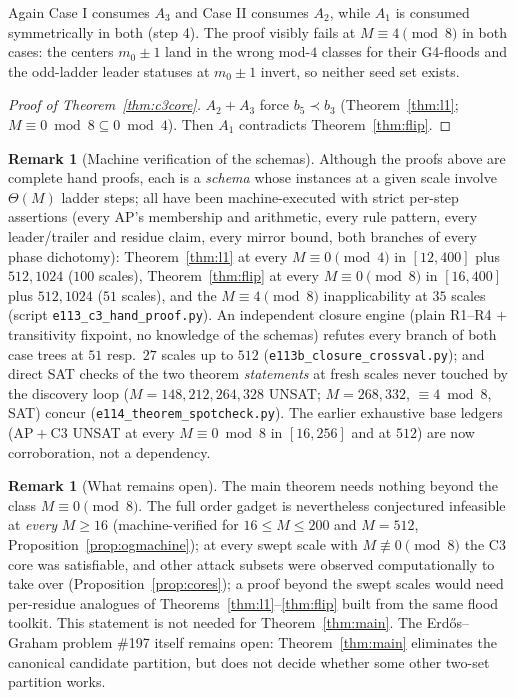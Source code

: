 \documentclass[11pt]{article}
\theoremstyle{definition}
\newtheorem{remark}[theorem]{Remark}
\begin{document}
Again Case I consumes $A_3$ and Case II consumes $A_2$, while $A_1$ is
consumed symmetrically in both (step 4). The proof visibly fails at
$M \equiv 4 \pmod 8$ in both cases: the centers $m_0 \pm 1$ land in
the wrong mod-$4$ classes for their G4-floods and the odd-ladder
leader statuses at $m_0 \pm 1$ invert, so neither seed set exists.

\begin{proof}[Proof of Theorem~\ref{thm:c3core}]
$A_2 + A_3$ force $b_5 \prec b_3$ (Theorem~\ref{thm:l1};
$M \equiv 0 \bmod 8 \subseteq 0 \bmod 4$). Then $A_1$ contradicts
Theorem~\ref{thm:flip}.
\end{proof}

\begin{remark}[Machine verification of the schemas]\label{rem:c3machine}
Although the proofs above are complete hand proofs, each is a
\emph{schema} whose instances at a given scale involve $\Theta(M)$
ladder steps; all have been machine-executed with strict per-step
assertions (every AP's membership and arithmetic, every rule pattern,
every leader/trailer and residue claim, every mirror bound, both
branches of every phase dichotomy): Theorem~\ref{thm:l1} at every
$M \equiv 0 \pmod 4$ in $[12, 400]$ plus $512, 1024$ ($100$ scales),
Theorem~\ref{thm:flip} at every $M \equiv 0 \pmod 8$ in $[16, 400]$
plus $512, 1024$ ($51$ scales), and the $M \equiv 4 \pmod 8$
inapplicability at $35$ scales
(script \texttt{e113\_c3\_hand\_proof.py}). An independent closure
engine (plain R1--R4 $+$ transitivity fixpoint, no knowledge of the
schemas) refutes every branch of both case trees at $51$ resp.\ $27$
scales up to $512$ (\texttt{e113b\_closure\_crossval.py}); and direct
SAT checks of the two theorem \emph{statements} at fresh scales never
touched by the discovery loop ($M = 148, 212, 264, 328$ UNSAT;
$M = 268, 332$, $\equiv 4 \bmod 8$, SAT) concur
(\texttt{e114\_theorem\_spotcheck.py}). The earlier exhaustive base
ledgers (AP${}+{}$C3 UNSAT at every $M \equiv 0 \bmod 8$ in
$[16, 256]$ and at $512$) are now corroboration, not a dependency.
\end{remark}

\begin{remark}[What remains open]\label{rem:c3open}
The main theorem needs nothing beyond the class $M \equiv 0 \pmod 8$.
The full order gadget is nevertheless conjectured infeasible at
\emph{every} $M \ge 16$ (machine-verified for $16 \le M \le 200$ and
$M = 512$, Proposition~\ref{prop:ogmachine}); at every swept scale with
$M \not\equiv 0 \pmod 8$ the C3 core was satisfiable, and other attack
subsets were observed computationally to take over
(Proposition~\ref{prop:cores}); a proof beyond the swept scales would
need per-residue analogues of Theorems~\ref{thm:l1}--\ref{thm:flip}
built from the same flood toolkit. This statement is not needed for
Theorem~\ref{thm:main}. The Erd\H{o}s--Graham problem \#197 itself
remains open: Theorem~\ref{thm:main} eliminates the canonical
candidate partition, but does not decide whether some other two-set
partition works.
\end{remark}
\end{document}
